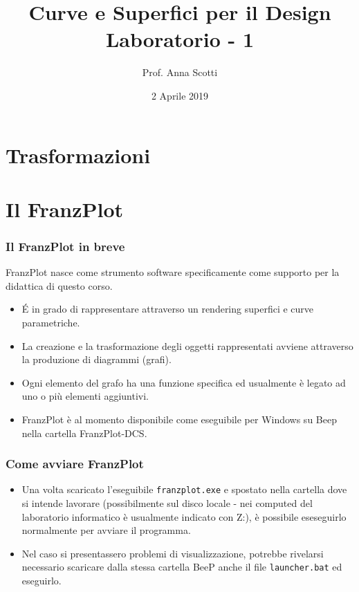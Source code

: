 \documentclass{beamer}
\title[Curve e Sup. - Lab 1]{Curve e Superfici per il Design \\ Laboratorio - 1}
\author[Prof. Scotti]{Prof. Anna Scotti}
\date{2 Aprile 2019}
\newcommand{\frnzplt}{FranzPlot }
\begin{document}
\begin{frame}
\maketitle
\end{frame}
\section{Trasformazioni}

\section{Il \frnzplt}
\begin{frame}
\frametitle{Il \frnzplt in breve}
\frnzplt nasce come strumento software specificamente come supporto per la didattica di questo corso.
\begin{itemize}
  \item \'E in grado di rappresentare attraverso un rendering superfici e curve parametriche.
  \item La creazione e la trasformazione degli oggetti rappresentati avviene attraverso la produzione di diagrammi (grafi).
  \item Ogni elemento del grafo ha una funzione specifica ed usualmente \`e legato ad uno o pi\`u elementi aggiuntivi.
\item \frnzplt \`e al momento disponibile come eseguibile per Windows su Beep nella cartella FranzPlot-DCS. 
\end{itemize}
\end{frame}
\begin{frame}
\frametitle{Come avviare \frnzplt}
\begin{itemize}
\item Una volta scaricato l'eseguibile \texttt{franzplot.exe} e spostato nella
cartella dove si intende lavorare (possibilmente sul disco locale - nei
computed del laboratorio informatico \`e usualmente indicato con Z:), \`e
possibile eseseguirlo normalmente per avviare il programma.  
\item Nel caso si
presentassero problemi di visualizzazione, potrebbe rivelarsi necessario
scaricare dalla stessa cartella BeeP anche il file \texttt{launcher.bat} ed eseguirlo.
\end{itemize}
\end{frame}
\end{document}
